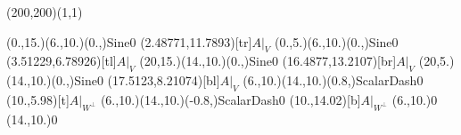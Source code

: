 \unitlength=1bp%

\begin{feynartspicture}(200,200)(1,1)

\FADiagram{}
\FAProp(0.,15.)(6.,10.)(0.,){Sine}{0}
\FALabel(2.48771,11.7893)[tr]{$A|_V$}
\FAProp(0.,5.)(6.,10.)(0.,){Sine}{0}
\FALabel(3.51229,6.78926)[tl]{$A|_V$}
\FAProp(20,15.)(14.,10.)(0.,){Sine}{0}
\FALabel(16.4877,13.2107)[br]{$A|_V$}
\FAProp(20,5.)(14.,10.)(0.,){Sine}{0}
\FALabel(17.5123,8.21074)[bl]{$A|_V$}
\FAProp(6.,10.)(14.,10.)(0.8,){ScalarDash}{0}
\FALabel(10.,5.98)[t]{$A|_{W^\perp}$}
\FAProp(6.,10.)(14.,10.)(-0.8,){ScalarDash}{0}
\FALabel(10.,14.02)[b]{$A|_{W^\perp}$}
\FAVert(6.,10.){0}
\FAVert(14.,10.){0}
\end{feynartspicture}

